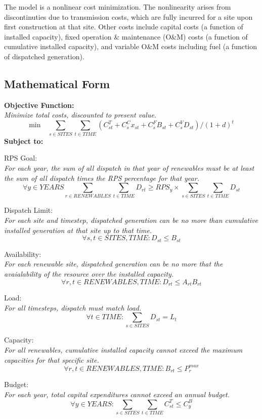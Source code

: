 \documentclass[12pt,letterpaper,fleqn]{article}
\begin{document}
The model is a nonlinear cost minimization. The nonlinearity arises
from discontinuties due to transmission costs, which are fully
incurred for a site upon first construction at that site. Other costs
include capital costs (a function of installed capacity), fixed
operation \& maintenance (O\&M) costs (a function of cumulative
installed capacity), and variable O\&M costs including fuel (a function of dispatched
generation). 

\subsection{Mathematical Form}

\textbf{Objective Function:}\\
\emph{Minimize total costs, discounted to present value.}
  \[\text{min} \quad  \sum_{s \in SITES}\sum_{t \in TIME}(C_{st}^T + C_s^Cx_{st}
  + C_s^FB_{st} + C_s^VD_{st}) / (1 + d)^t\]
  \textbf{Subject to:}

  RPS Goal:\\
  \emph{For each year, the sum of all dispatch in that year of
    renewables must be at least the sum of all dispatch times the RPS
    percentage for that year.}
  \[\forall y \in YEARS \sum_{r \in RENEWABLES}\sum_{t \in TIME} D_{rt} \ge RPS_y \times
  \sum_{s \in SITES}\sum_{t \in TIME} D_{st}\]

  Dispatch Limit:\\
  \emph{For each site and timestep, dispatched generation can be no
    more than cumulative installed generation at that site up to that
    time.}
  \[\forall s,t \in SITES, TIME: D_{st} \le B_{st}\]

  Availability:\\
  \emph{For each renewable site, dispatched generation can be no more
    that the avaialability of the resource over the installed
    capacity.}
  \[\forall r,t \in RENEWABLES, TIME: D_{rt} \le A_{rt}B_{rt}\]

  Load:\\
  \emph{For all timesteps, dispatch must match load.}
  \[\forall t \in TIME: \sum_{s \in SITES} D_{st} = L_{t}\]

  Capacity:\\
  \emph{For all renewables, cumulative installed capacity cannot
    exceed the maximum capacities for that specific site.}
  \[\forall r,t \in RENEWABLES, TIME: B_{rt} \le P_r^{max}\]

  Budget:\\
  \emph{For each year, total capital expenditures cannot exceed an
    annual budget.}
  \[\forall y \in YEARS: \sum_{s \in SITES}\sum_{t \in TIME} C_{st}^T
  \le C_{y}^B\]
\end{document}
